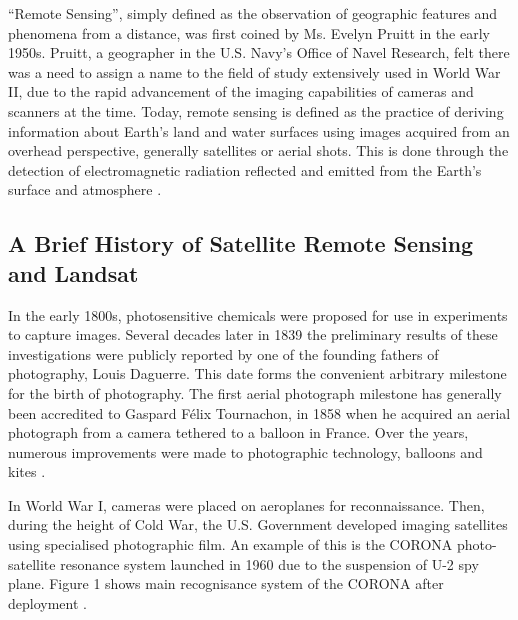 
``Remote Sensing'', simply defined as the observation of geographic features and phenomena from a distance, was first coined by Ms. Evelyn Pruitt in the early 1950s. Pruitt, a geographer in the U.S. Navy's Office of Navel Research, felt there was a need to assign a name to the field of study extensively used in World War II, due to the rapid advancement of the imaging capabilities of cameras and scanners at the time. Today, remote sensing is defined as the practice of deriving information about Earth's land and water surfaces using images acquired from an overhead perspective, generally satellites or aerial shots. This is done through the detection of electromagnetic radiation reflected and emitted from the Earth's surface and atmosphere \cite{campbell2011introduction}. 


\subsection{A Brief History of Satellite Remote Sensing and Landsat}
In the early 1800s, photosensitive chemicals were proposed for use in experiments to capture images. Several decades later in 1839 the preliminary results of these investigations were publicly reported by one of the founding fathers of photography, Louis Daguerre. This date forms the convenient arbitrary milestone for the birth of photography. The first aerial photograph milestone has generally been accredited to Gaspard F\'elix Tournachon, in 1858 when he acquired an aerial photograph from a camera tethered to a balloon in France. Over the years, numerous improvements were made to photographic technology, balloons and kites \cite{campbell2011introduction}. 
\par
In World War I, cameras were placed on aeroplanes for reconnaissance. Then, during the height of Cold War, the U.S. Government developed imaging satellites using specialised photographic film. An example of this is the CORONA photo-satellite resonance system launched in 1960 due to the suspension of U-2 spy plane. Figure 1 shows main recognisance system of the CORONA after deployment \cite{CORONA}. 
\par





